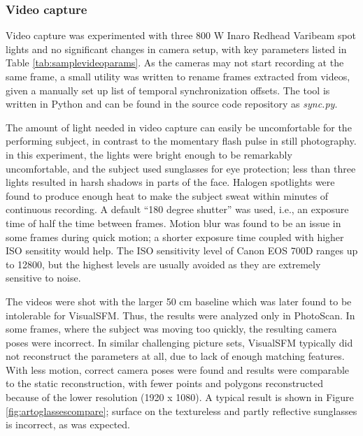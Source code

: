 \afterpage{\clearpage}
\subsubsection{Video capture}


Video capture was experimented with three 800 W Inaro Redhead Varibeam spot lights and no significant changes in camera setup, with key parameters listed in Table \ref{tab:samplevideoparams}.
As the cameras may not start recording at the same frame, a small utility was written to rename frames extracted from videos, given a manually set up list of temporal synchronization offsets.
The tool is written in Python and can be found in the source code repository as \emph{sync.py}.

The amount of light needed in video capture can easily be uncomfortable for the performing subject, in contrast to the momentary flash pulse in still photography.
in this experiment, the lights were bright enough to be remarkably uncomfortable, and the subject used sunglasses for eye protection; less than three lights resulted in harsh shadows in parts of the face.
Halogen spotlights were found to produce enough heat to make the subject sweat within minutes of continuous recording.
A default ``180 degree shutter'' was used, i.e., an exposure time of half the time between frames.
Motion blur was found to be an issue in some frames during quick motion; a shorter exposure time coupled with higher ISO sensitity would help.
The ISO sensitivity level of Canon EOS 700D ranges up to 12800, but the highest levels are usually avoided as they are extremely sensitive to noise.

The videos were shot with the larger 50 cm baseline which was later found to be intolerable for VisualSFM.
Thus, the results were analyzed only in PhotoScan.
In some frames, where the subject was moving too quickly, the resulting camera poses were incorrect.
In similar challenging picture sets, VisualSFM typically did not reconstruct the parameters at all, due to lack of enough matching features.
With less motion, correct camera poses were found and results were comparable to the static reconstruction, with fewer points and polygons reconstructed because of the lower resolution (1920 x 1080).
A typical result is shown in Figure \ref{fig:artoglassescompare}; surface on the textureless and partly reflective sunglasses is incorrect, as was expected.


